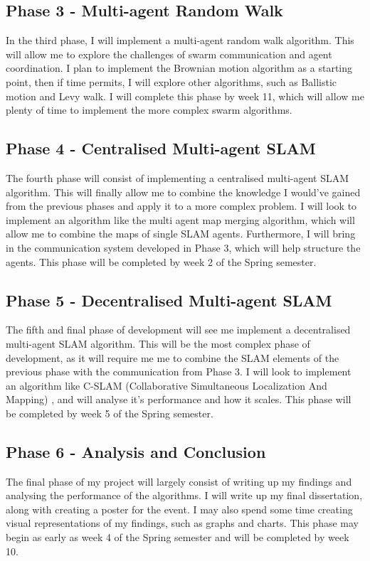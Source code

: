 \documentclass[12pt]{article}
\begin{document}
\subsection{Phase 3 - Multi-agent Random Walk}
In the third phase, I will implement a multi-agent random walk algorithm. This will allow me to explore the challenges of swarm
communication and agent coordination. I plan to implement the Brownian motion algorithm as a starting point, then if time permits,
I will explore other algorithms, such as Ballistic motion and Levy walk. I will complete this phase by week 11, which will allow me
plenty of time to implement the more complex swarm algorithms.
\subsection{Phase 4 - Centralised Multi-agent SLAM}
The fourth phase will consist of implementing a centralised multi-agent SLAM algorithm. This will finally allow me to combine
the knowledge I would've gained from the previous phases and apply it to a more complex problem. I will look to implement an
algorithm like the multi agent map merging algorithm, which will allow me to combine the maps of single SLAM agents. Furthermore,
I will bring in the communication system developed in Phase 3, which will help structure the agents. This phase will be completed by
week 2 of the Spring semester.
\subsection{Phase 5 - Decentralised Multi-agent SLAM}
The fifth and final phase of development will see me implement a decentralised multi-agent SLAM algorithm. This will be the most
complex phase of development, as it will require me me to combine the SLAM elements of the previous phase with the communication
from Phase 3. I will look to implement an algorithm like C-SLAM (Collaborative Simultaneous Localization And Mapping) \cite{C-SLAM}, and will analyse it's performance and how it scales. This phase
will be completed by week 5 of the Spring semester.
\subsection{Phase 6 - Analysis and Conclusion}
The final phase of my project will largely consist of writing up my findings and analysing the performance of the algorithms. I will
write up my final dissertation, along with creating a poster for the event. I may also spend some time creating visual representations
of my findings, such as graphs and charts. This phase may begin as early as week 4 of the Spring semester and will be completed by
week 10.
\end{document}

